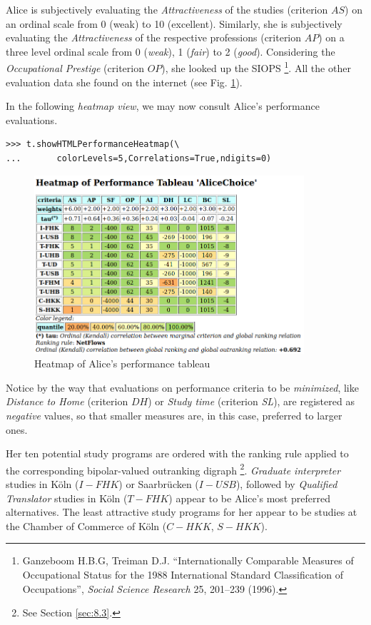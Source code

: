 Alice is subjectively evaluating the \emph{Attractiveness} of the studies (criterion $AS$) on an ordinal scale from 0 (weak) to 10 (excellent). Similarly, she is subjectively evaluating the \emph{Attractiveness} of the respective professions (criterion $AP$) on a three level ordinal scale from 0 (\emph{weak}), 1 (\emph{fair}) to 2 (\emph{good}). Considering the \emph{Occupational Prestige} (criterion $OP$), she looked up the SIOPS \footnote{Ganzeboom H.B.G, Treiman D.J. ``Internationally Comparable Measures of Occupational Status for the 1988 International Standard Classification of Occupations'', \emph{Social Science Research} 25, 201–239 (1996).}. All the other evaluation data she found on the internet (see Fig. \ref{fig:12.3}).

In the following \emph{heatmap view}, we may now consult Alice's performance evaluations.

\begin{lstlisting}
>>> t.showHTMLPerformanceHeatmap(\
...       colorLevels=5,Correlations=True,ndigits=0)
\end{lstlisting}
\begin{figure}[h]
\sidecaption
\includegraphics[width=10cm]{Figures/aliceHeatmap.png}
\caption{Heatmap of Alice's performance tableau}
\label{fig:12.3}       %
\end{figure}

Notice by the way that evaluations on performance criteria to be \emph{minimized}, like \emph{Distance to Home} (criterion $DH$) or \emph{Study time} (criterion \emph{SL}), are registered as \emph{negative} values, so that smaller measures are, in this case, preferred to larger ones.

Her ten potential study programs are ordered with the \NetFlows ranking rule applied to the corresponding bipolar-valued outranking digraph \footnote{See Section \ref{sec:8.3}.}. \emph{Graduate interpreter} studies in Köln ($I-FHK$) or Saarbrücken ($I-USB$), followed by \emph{Qualified Translator} studies in Köln ($T-FHK$) appear to be Alice's most preferred alternatives. The least attractive study programs for her appear to be studies at the Chamber of Commerce of Köln ($C-HKK$, $S-HKK$).

